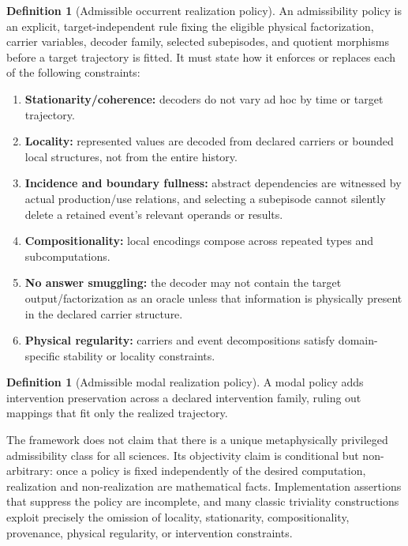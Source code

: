 \documentclass[11pt,a4paper]{article}
\theoremstyle{clean}
\theoremstyle{definition}
\newtheorem{definition}[theorem]{Definition}
\begin{document}
\begin{definition}[Admissible occurrent realization policy]
An admissibility policy is an explicit, target-independent rule fixing the eligible physical factorization, carrier variables, decoder family, selected subepisodes, and quotient morphisms before a target trajectory is fitted. It must state how it enforces or replaces each of the following constraints:
\begin{enumerate}
  \item \textbf{Stationarity/coherence:} decoders do not vary ad hoc by time or target trajectory.
  \item \textbf{Locality:} represented values are decoded from declared carriers or bounded local structures, not from the entire history.
  \item \textbf{Incidence and boundary fullness:} abstract dependencies are witnessed by actual production/use relations, and selecting a subepisode cannot silently delete a retained event's relevant operands or results.
  \item \textbf{Compositionality:} local encodings compose across repeated types and subcomputations.
  \item \textbf{No answer smuggling:} the decoder may not contain the target output/factorization as an oracle unless that information is physically present in the declared carrier structure.
  \item \textbf{Physical regularity:} carriers and event decompositions satisfy domain-specific stability or locality constraints.
\end{enumerate}
\end{definition}

\begin{definition}[Admissible modal realization policy]
A modal policy adds intervention preservation across a declared intervention family, ruling out mappings that fit only the realized trajectory.
\end{definition}

\begin{cautionbox}
The framework does not claim that there is a unique metaphysically privileged admissibility class for all sciences. Its objectivity claim is conditional but non-arbitrary: once a policy is fixed independently of the desired computation, realization and non-realization are mathematical facts. Implementation assertions that suppress the policy are incomplete, and many classic triviality constructions exploit precisely the omission of locality, stationarity, compositionality, provenance, physical regularity, or intervention constraints.
\end{cautionbox}
\end{document}
